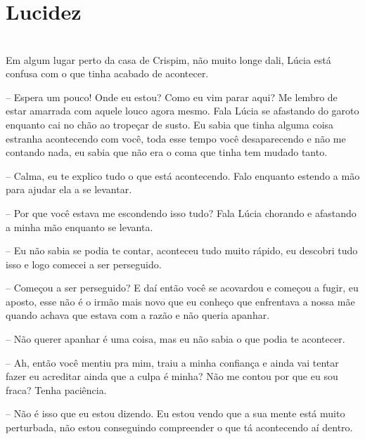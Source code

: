 
	
	
\newpage
	
	
\ifdefined\useChapters
	\chapter{Lucidez}

\else
\chapter{}
\fi
Em algum lugar perto da casa de Crispim, não muito longe dali, Lúcia está confusa com o que tinha acabado de acontecer.

-- Espera um pouco! Onde eu estou? Como eu vim parar aqui? Me lembro de estar amarrada com aquele louco agora mesmo. Fala Lúcia se afastando do garoto enquanto cai no chão ao tropeçar de susto. Eu sabia que tinha alguma coisa estranha acontecendo com você, toda esse tempo você desaparecendo e não me contando nada, eu sabia que não era o coma que tinha tem mudado tanto.

-- Calma, eu te explico tudo o que está acontecendo. Falo enquanto estendo a mão para ajudar ela a se levantar.

-- Por que você estava me escondendo isso tudo? Fala Lúcia chorando e afastando a minha mão enquanto se levanta.

-- Eu não sabia se podia te contar, aconteceu tudo muito rápido, eu descobri tudo isso e logo comecei a ser perseguido.

-- Começou a ser perseguido? E daí então você se acovardou e começou a fugir, eu aposto, esse não é o irmão mais novo que eu conheço que enfrentava a nossa mãe quando achava que estava com a razão e não queria apanhar.

-- Não querer apanhar é uma coisa, mas eu não sabia o que podia te acontecer.

-- Ah, então você mentiu pra mim, traiu a minha confiança e ainda vai tentar fazer eu acreditar ainda que a culpa é minha? Não me contou por que eu sou fraca? Tenha paciência.

-- Não é isso que eu estou dizendo. Eu estou vendo que a sua mente está muito perturbada, não estou conseguindo compreender o que tá acontecendo aí dentro.

